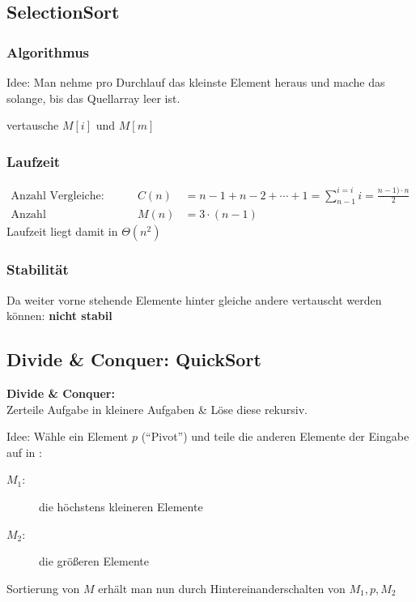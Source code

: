 \documentclass{scrartcl}
\begin{document}
\subsection{SelectionSort}
\subsubsection{Algorithmus}
Idee: Man nehme pro Durchlauf das kleinste Element heraus und mache das solange, bis das Quellarray leer ist.
\begin{algorithmic}
	\ENDIF
	\ENDFOR
	{vertausche $M[i]$ und $M[m]$}
\ENDFOR
\end{algorithmic}

\subsubsection{Laufzeit}
\begin{align*}
\textrm{Anzahl Vergleiche:} & & C(n) &= n-1 + n-2 + \cdots + 1 = \sum_{n-1}^{i=i}i = \frac{n-1)\cdot n}{2} \\
\textrm{Anzahl Umspeicherungen:} & & M(n) &= 3\cdot (n-1)
\end{align*}
Laufzeit liegt damit in $\Theta(n^2)$
\subsubsection{Stabilität}
Da weiter vorne stehende Elemente hinter gleiche andere vertauscht werden können: \textbf{nicht stabil}

\subsection{Divide \& Conquer: QuickSort}
\begin{shaded}
\textbf{Divide \& Conquer:} \\ Zerteile Aufgabe in kleinere Aufgaben \& Löse diese rekursiv.
\end{shaded}

Idee: Wähle ein Element $p$ ("`Pivot"') und teile die anderen Elemente der Eingabe auf in :
\begin{description}
	\item[$M_1$:] die höchstens kleineren Elemente
	\item[$M_2$:] die größeren Elemente
\end{description}
Sortierung von $M$ erhält man nun durch Hintereinanderschalten von $M_1,p,M_2$
\end{document}
